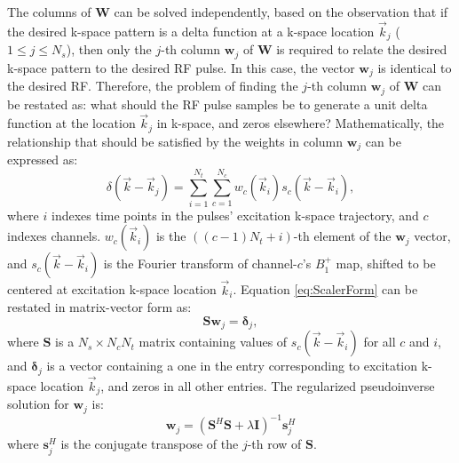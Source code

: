 \par The columns of $\bm{W}$ can be solved independently, 
based on the observation that if the desired k-space pattern is a delta function at a k-space location 
$\vec{k}_j$ ($1\leq j \leq N_s$), 
then only the $j$-th column $\bm{w}_j$ of $\bm{W}$ is required to relate 
the desired k-space pattern to the desired RF pulse. 
In this case, the vector $\bm{w}_j$ is identical to the desired RF. 
Therefore, the problem of finding the $j$-th column $\bm{w}_j$ of $\bm{W}$ can be restated as: 
what should the RF pulse samples be to generate a unit delta function at the location $\vec{k}_j$ in k-space, 
and zeros elsewhere? 
Mathematically, the relationship that should be satisfied by the weights in column $\bm{w}_j$  can be expressed as:   
\begin{equation}\label{eq:ScalerForm}
\delta(\vec{k}-\vec{k}_j)=\sum_{i=1}^{N_t}\sum_{c=1}^{N_c} w_c(\vec{k}_i) s_c(\vec{k}-\vec{k}_i),
\end{equation}
where $i$ indexes time points in the pulses' excitation k-space trajectory, 
and $c$ indexes channels. 
$w_c(\vec{k}_i)$ is the $((c-1)N_t+i)$-th element of the $\bm{w}_j$ vector,
and $s_c(\vec{k}-\vec{k}_i)$ is the Fourier transform of channel-$c$'s $B_1^+$ map, 
shifted to be centered at excitation k-space location $\vec{k}_i$. 
Equation \ref{eq:ScalerForm} can be restated in matrix-vector form as:                                       
\begin{equation}\label{eq:MatrixForm}
\bm{Sw}_j=\bm{\delta}_j,
\end{equation}
where $\bm{S}$ is a $N_s \times N_c  N_t$ 
matrix containing values of $s_c(\vec{k}-\vec{k}_i)$ for all $c$ and $i$,
and $\bm{\delta}_j$ is a vector containing a one in the entry corresponding to excitation k-space location
$\vec{k}_j$, and zeros in all other entries. 
The regularized pseudoinverse solution for $\bm{w}_j$ is:                      
\begin{equation}\label{eq:Solution}
\bm{w}_j=\left( \bm{S}^{H} \bm{S} + \lambda \bm{I} \right) ^{-1} \bm{s}_j^{H}
\end{equation}
where $\bm{s}_j^{H}$ is the conjugate transpose of the $j$-th row of $\bm{S}$. 

